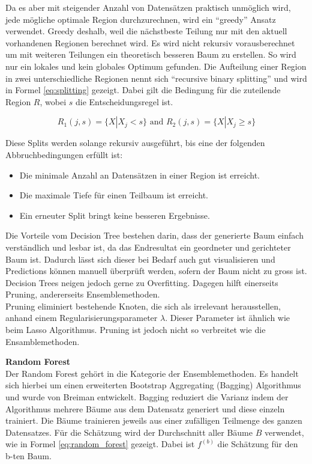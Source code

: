 Da es aber mit steigender Anzahl von Datensätzen praktisch unmöglich wird, jede mögliche optimale Region durchzurechnen, wird ein “greedy” Ansatz verwendet. Greedy deshalb, weil die nächstbeste Teilung nur mit den aktuell vorhandenen Regionen berechnet wird. Es wird nicht rekursiv vorausberechnet um mit weiteren Teilungen ein theoretisch besseren Baum zu erstellen. So wird nur ein lokales und kein globales Optimum gefunden. Die Aufteilung einer Region in zwei unterschiedliche Regionen nennt sich “recursive binary splitting” und wird in Formel \eqref{eq:splitting} gezeigt. Dabei gilt die Bedingung für die zuteilende Region $R$, wobei $s$ die Entscheidungsregel ist.

\begin{equation}\label{eq:splitting}
R_1(j,s) = \{X|X_j < s\} \text{ and } R_2(j,s) = \{X|X_j \geq s\}
\end{equation}

Diese Splits werden solange rekursiv ausgeführt, bis eine der folgenden Abbruchbedingungen erfüllt ist:

\begin{itemize}
\item Die minimale Anzahl an Datensätzen in einer Region ist erreicht.
\item Die maximale Tiefe für einen Teilbaum ist erreicht.
\item Ein erneuter Split bringt keine besseren Ergebnisse.
\end{itemize}

Die Vorteile vom Decision Tree bestehen darin, dass der generierte Baum einfach verständlich und lesbar ist, da das Endresultat ein geordneter und gerichteter Baum ist. Dadurch lässt sich dieser bei Bedarf auch gut visualisieren und Predictions können manuell überprüft werden, sofern der Baum nicht zu gross ist.\\
Decision Trees neigen jedoch gerne zu Overfitting. Dagegen hilft einerseits Pruning, andererseits Ensemblemethoden.\\
Pruning eliminiert bestehende Knoten, die sich als irrelevant herausstellen, anhand einem Regularisierungsparameter $\lambda$. Dieser Parameter ist ähnlich wie beim Lasso Algorithmus. Pruning ist jedoch nicht so verbreitet wie die Ensamblemethoden.

\textbf{Random Forest}\\
Der Random Forest gehört in die Kategorie der Ensemblemethoden. Es handelt sich hierbei um einen erweiterten Bootstrap Aggregating (Bagging) Algorithmus und wurde von Breiman entwickelt. Bagging reduziert die Varianz indem der Algorithmus mehrere Bäume aus dem Datensatz generiert und diese einzeln trainiert.  Die Bäume trainieren jeweils aus einer zufälligen Teilmenge des ganzen Datensatzes. Für die Schätzung wird der Durchschnitt aller Bäume $B$ verwendet, wie in Formel \eqref{eq:random_forest} gezeigt. Dabei ist $f^{(b)}$ die Schätzung für den b-ten Baum.

